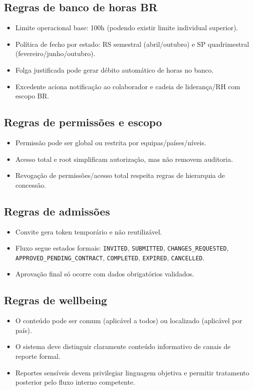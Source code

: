 \documentclass[11pt,a4paper,twoside]{article}
\begin{document}
\subsection{Regras de banco de horas BR}
\begin{itemize}
  \item Limite operacional base: 100h (podendo existir limite individual superior).
  \item Política de fecho por estado: RS semestral (abril/outubro) e SP quadrimestral (fevereiro/junho/outubro).
  \item Folga justificada pode gerar débito automático de horas no banco.
  \item Excedente aciona notificação ao colaborador e cadeia de liderança/RH com escopo BR.
\end{itemize}

\subsection{Regras de permissões e escopo}
\begin{itemize}
  \item Permissão pode ser global ou restrita por equipas/países/níveis.
  \item Acesso total e root simplificam autorização, mas não removem auditoria.
  \item Revogação de permissões/acesso total respeita regras de hierarquia de concessão.
\end{itemize}

\subsection{Regras de admissões}
\begin{itemize}
  \item Convite gera token temporário e não reutilizável.
  \item Fluxo segue estados formais: \texttt{INVITED}, \texttt{SUBMITTED}, \texttt{CHANGES\_REQUESTED}, \texttt{APPROVED\_PENDING\_CONTRACT}, \texttt{COMPLETED}, \texttt{EXPIRED}, \texttt{CANCELLED}.
  \item Aprovação final só ocorre com dados obrigatórios validados.
\end{itemize}

\subsection{Regras de wellbeing}
\begin{itemize}
  \item O conteúdo pode ser comum (aplicável a todos) ou localizado (aplicável por país).
  \item O sistema deve distinguir claramente conteúdo informativo de canais de reporte formal.
  \item Reportes sensíveis devem privilegiar linguagem objetiva e permitir tratamento posterior pelo fluxo interno competente.
\end{itemize}
\end{document}

